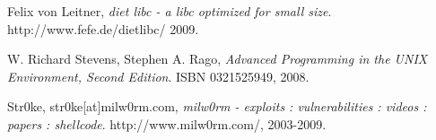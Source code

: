 \clearpage
{}
{}

\begin{thebibliography}{9}
 
  Felix von Leitner,
  \emph{diet libc - a libc optimized for small size}.
  http://www.fefe.de/dietlibc/
  2009.
 

  W. Richard Stevens, Stephen A. Rago,
  \emph{Advanced Programming in the UNIX Environment, Second Edition}.
  ISBN 0321525949,
  2008.


  Str0ke, str0ke[at]milw0rm.com,
  \emph{milw0rm - exploits : vulnerabilities : videos : papers : shellcode}.
  http://www.milw0rm.com/,
  2003-2009.


\end{thebibliography}

